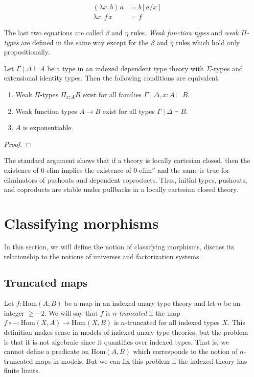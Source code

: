 \documentclass[reqno]{amsart}
\theoremstyle{definition}
\theoremstyle{remark}
\newcommand{\ob}{}
\newcommand{\fs}[1]{\mathrm{#1}}
\newcommand{\Hom}{\fs{Hom}}
\numberwithin{figure}{section}
\begin{document}
\begin{align*}
(\lambda x.\,b)\,a & = b[a/x] \\
\lambda x.\,f\,x & = f
\end{align*}

The last two equations are called $\beta$ and $\eta$ rules.
\emph{Weak function types} and \emph{weak $\Pi$-types} are defined in the same way except for the $\beta$ and $\eta$ rules which hold only propositionally.

\begin{prop}
Let $\Gamma \mid \Delta \vdash A \ob$ be a type in an indexed dependent type theory with $\Sigma$-types and extensional identity types.
Then the following conditions are equivalent:
\begin{enumerate}
\item Weak $\Pi$-types $\Pi_{x : A} B$ exist for all families $\Gamma \mid \Delta, x : A \vdash B \ob$.
\item Weak function types $A \to B$ exist for all types $\Gamma \mid \Delta \vdash B \ob$.
\item $A$ is exponentiable.
\end{enumerate}
\end{prop}
\begin{proof}
\end{proof}

The standard argument shows that if a theory is locally cartesian closed, then the existence of $0\text{-}\fs{elim}$ implies the existence of $0\text{-}\fs{elim''}$ and the same is true for eliminators of pushouts and dependent coproducts.
Thus, initial types, pushouts, and coproducts are stable under pullbacks in a locally cartesian closed theory.

\section{Classifying morphisms}

In this section, we will define the notion of classifying morphisms, discuss its relationship to the notions of universes and factorization systems.

\subsection{Truncated maps}

Let $f : \Hom(A,B)$ be a map in an indexed unary type theory and let $n$ be an integer $\geq -2$.
We will say that $f$ is \emph{$n$-truncated} if the map $f \circ - : \Hom(X,A) \to \Hom(X,B)$ is $n$-truncated for all indexed types $X$.
This definition makes sense in models of indexed unary type theories, but the problem is that it is not algebraic since it quantifies over indexed types.
That is, we cannot define a predicate on $\Hom(A,B)$ which corresponds to the notion of $n$-truncated maps in models.
But we can fix this problem if the indexed theory has finite limits.
\end{document}
